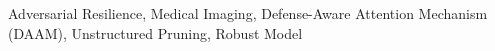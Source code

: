 
Adversarial Resilience, Medical Imaging, Defense-Aware Attention Mechanism (DAAM), Unstructured Pruning, Robust Model